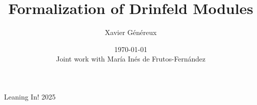 \newcommand\frameheading[1]{%
  \par\bigskip
  {\Large\usebeamercolor[fg]{palette primary}#1}\par\smallskip}

\newcommand{\orange}[1]{\textcolor{csorange}{#1}}
\newcommand{\blue}[1]{\textcolor{csblue}{#1}}
\newcommand{\grey}[1]{\textcolor{lightgrey}{#1}}
\newcommand{\green}[1]{\textcolor{csgreen}{#1}}
\newcommand{\purple}[1]{\textcolor{cspurple}{#1}}


\renewcommand{\iff}{\leftrightarrow}
\newcommand{\com}{,\,}
\renewcommand{\emph}[1]{\blue{#1}}
\newcommand{\mv}[1]{\ensuremath{\mathit{?#1}}}
\newcommand{\rulename}[1]{\textrm{#1}}
\newcommand{\rulelabel}[1]{\quad \text{\rulename{#1}}}
\newcommand{\Expr}{\ensuremath{\mathbb{E}}}
\newcommand{\Hyps}{\ensuremath{\mathbb{H}}}
\newcommand{\Matches}{\ensuremath{\mathbb{M}}}
\newcommand{\Slots}{\ensuremath{\mathbb{S}}}
\newcommand{\Vars}{\ensuremath{\mathbb{V}}}
\newcommand{\Pow}[1]{\ensuremath{\mathcal{P}(#1)}}
\newcommand{\dom}[1]{\ensuremath{\mathrm{dom}(#1)}}
\newcommand{\cod}[1]{\ensuremath{\mathrm{cod}(#1)}}
\newenvironment{rapppic}{\begin{tikzpicture}[outer sep=auto, level distance=3em]}{\end{tikzpicture}}
\newenvironment{rapp}{%
  \begin{tcolorbox}
  \begin{center}
  \begin{rapppic}
}{
  \end{rapppic}
  \end{center}
  \end{tcolorbox}%
}



\title{For­mal­iza­tion of Drin­feld Mod­ules} 
\author{Xavier Généreux}
\date[\today]{\today \\ \vspace{1cm} Joint work with María Inés de Frutos-Fernández}
\institute 
{
	Lean­ing In! 2025
}




